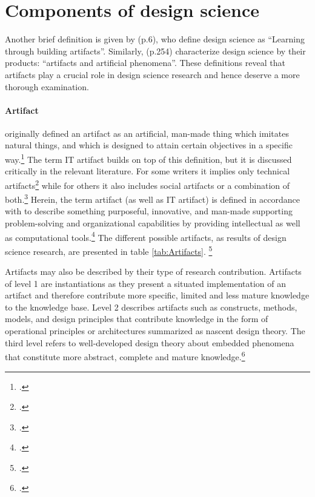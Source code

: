\section{Components of design science} \label{sec:ComponentsDesignScience}
Another brief definition is given by \cite{VaishnaviDesignScienceResearch} (p.6), who define design science as \enquote{Learning through building artifacts}. Similarly, \cite{MarchDesignnaturalscience1995} (p.254) characterize design science by their products: \enquote{artifacts and artificial phenomena}. These definitions reveal that artifacts play a crucial role in design science research and hence deserve a more thorough examination.

\paragraph{Artifact} \cite{Simonsciencesartificial1996} originally defined an artifact as an artificial, man-made thing which imitates natural things, and which is designed to attain certain objectives in a specific way.\footcites[Cf.][p.5]{Simonsciencesartificial1996} The term \ac{IT} artifact builds on top of this definition, but it is discussed critically in the relevant literature. For some writers it implies only technical artifacts\footcites[Cf.][p.186]{BenbasatEmpiricalresearchinformation1999}[cf.][p.50]{AlterconceptITartifact2015}[cf.][p.121]{OrlikowskiResearchcommentaryDesperately2001} while for others it also includes social artifacts or a combination of both.\footcites[Cf.][p.1, p.6]{LeeGoingbackbasics2015}[cf.][p.59]{AlterconceptITartifact2015} Herein, the term artifact (as well as \ac{IT} artifact) is defined in accordance with \cite{HevnerDesignScienceResearch2004} to describe something purposeful, innovative, and man-made supporting problem-solving and organizational capabilities by providing intellectual as well as computational tools.\footcites[Cf.][p.76 et seqq]{HevnerDesignScienceResearch2004}[cf.][p.340]{GregorPositioningpresentingdesign2013} The different possible artifacts, as results of design science research, are presented in table \ref{tab:Artifacts}. \footcites[Cf.][p.256 et seq]{MarchDesignnaturalscience1995}[cf.][p.50]{PuraoDesignResearchTechnology2002}[cf.][p.77]{HevnerDesignResearchInformation2010}

Artifacts may also be described by their type of research contribution. Artifacts of level 1 are instantiations as they present a situated implementation of an artifact and therefore contribute more specific, limited and less mature knowledge to the knowledge base. Level 2 describes artifacts such as constructs, methods, models, and design principles that contribute knowledge in the form of operational principles or architectures summarized as nascent design theory. The third level refers to well-developed design theory about embedded phenomena that constitute more abstract, complete and mature knowledge.\footcite[Cf.][p.340]{GregorPositioningpresentingdesign2013} \label{topic:levels} 

